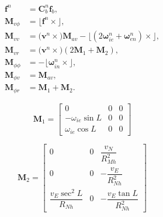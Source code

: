\begin{equation}
    \begin{aligned}
        \bm{f}^n          & = \bm{C}_{b}^n\bm{f}_{b},                                                                                                               \\
        \bm{M}_{v\phi}    & = \bigl\lfloor \bm{f}^n \times \bigr\rfloor,                                                                                                    \\
        \bm{M}_{vv}       & = \bigl( \bm{v}^n \times \bigr)\bm{M}_{av} - \bigl\lfloor (2\bm{\omega}_{ie}^n+\bm{\omega}_{en}^n) \times \bigr\rfloor, \\
        \bm{M}_{vr}       & = \bigl( \bm{v}^n \times \bigr)(2\bm{M}_1+\bm{M}_2),                                                         \\[4pt]
        \bm{M}_{\phi\phi} & = -\bigl\lfloor \bm{\omega}_{in}^n \times \bigr\rfloor,                                                                                         \\
        \bm{M}_{\phi v}   & = \bm{M}_{av},                                                                                                                                  \\
        \bm{M}_{\phi r}   & = \bm{M}_1 + \bm{M}_2.
    \end{aligned}
\end{equation}


\begin{equation}
    \bm{M}_1 =
    \begin{bmatrix}
        0                  & 0 & 0 \\
        -\omega_{ie}\sin L & 0 & 0 \\
        \omega_{ie}\cos L  & 0 & 0
    \end{bmatrix}
\end{equation}

\begin{equation}
    \bm{M}_2 =
    \begin{bmatrix}
        0                           & 0 & \dfrac{v_N}{R_{Mh}^2}        \\[4pt]
        0                           & 0 & -\dfrac{v_E}{R_{Nh}^2}       \\[4pt]
        \dfrac{v_E\sec^2 L}{R_{Nh}} & 0 & -\dfrac{v_E\tan L}{R_{Nh}^2}
    \end{bmatrix}
\end{equation}

